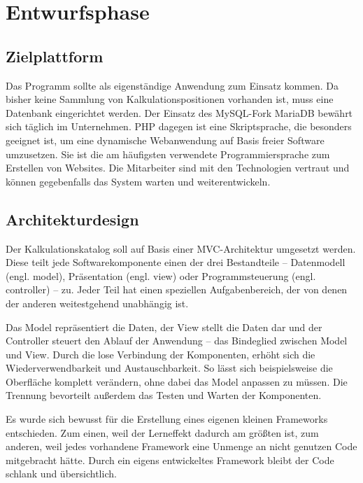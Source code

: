 \section{Entwurfsphase} 
\label{sec:Entwurfsphase}

\subsection{Zielplattform}
\label{sec:Zielplattform}
Das Programm sollte als eigenständige Anwendung zum Einsatz kommen. Da bisher
keine Sammlung von Kalkulationspositionen vorhanden ist, muss eine Datenbank
eingerichtet werden. Der Einsatz des My\acs{SQL}-Fork MariaDB bewährt sich
täglich im Unternehmen. \acs{PHP} dagegen ist eine Skriptsprache, die
besonders geeignet ist, um eine dynamische Webanwendung auf Basis freier
Software umzusetzen. Sie ist die am häufigsten verwendete Programmiersprache zum
Erstellen von Websites.\citet{PHP} Die Mitarbeiter sind mit den Technologien
vertraut und können gegebenfalls das System warten und weiterentwickeln.

\subsection{Architekturdesign}
\label{sec:Architekturdesign}
Der Kalkulationskatalog soll auf Basis einer \acs{MVC}-Architektur umgesetzt
werden. Diese teilt jede Softwarekomponente einen der drei
Bestandteile -- Datenmodell (engl. model), Präsentation (engl. view) oder
Programmsteuerung (engl. controller) \citet{ModelViewController} -- zu.
Jeder Teil hat einen speziellen Aufgabenbereich, der von denen der anderen
weitestgehend unabhängig ist. 

Das Model repräsentiert die Daten, der View stellt die Daten dar und der
Controller steuert den Ablauf der Anwendung -- das Bindeglied zwischen Model und
View. Durch die lose Verbindung der Komponenten, erhöht sich die
Wiederverwendbarkeit und Austauschbarkeit. So lässt sich beispielsweise die
Oberfläche komplett verändern, ohne dabei das Model anpassen zu müssen. Die
Trennung bevorteilt außerdem das Testen und Warten der Komponenten.

Es wurde sich bewusst für die Erstellung eines eigenen kleinen Frameworks
entschieden. Zum einen, weil der Lerneffekt dadurch am größten ist, zum anderen,
weil jedes vorhandene Framework eine Unmenge an nicht genutzen Code mitgebracht
hätte. Durch ein eigens entwickeltes Framework bleibt der Code schlank und
übersichtlich.

